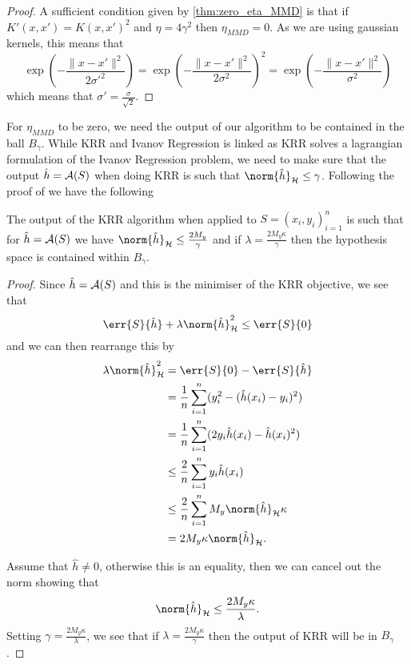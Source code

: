 \begin{proof}
  A sufficient condition given by \ref{thm:zero_eta_MMD} is that if \(K'(x, x') =
  K(x, x')^2\) and \(\eta = 4\gamma^2\) then \(\eta_{MMD} = 0\). As we are using
  gaussian kernels, this means that
  \begin{equation*}
    \exp(- \frac{\|x - x'\|^2}{2\sigma'^2}) = \exp(- \frac{\|x - x'\|^2}{2\sigma^2})^2 = \exp(- \frac{\|x - x'\|^2}{\sigma^2})
  \end{equation*}
  which means that \(\sigma' = \frac{\sigma}{\sqrt{2}}\).
\end{proof}

For \(\eta_{MMD}\) to be zero, we need the output of our algorithm to be
contained in the ball \(B_{\gamma}\). While KRR and Ivanov Regression is linked
as KRR solves a lagrangian formulation of the Ivanov Regression problem, we need
to make sure that the output \(\hat{h} = \mathcal{A}(S)\) when doing KRR is such that
\(\norm{\hat{h}}_{\rkhs{H}} \leq \gamma\). Following the proof of \cite[Lemma
1]{cortes14_domain_adapt_sampl_bias_correc} we have the following
\begin{lemma}
\label{lem:KRR-output-ball-bound} The output of the KRR algorithm when applied
to \(S = (x_{i}, y_{i})_{i=1}^{n}\) is such that for \(\hat{h} = \mathcal{A}(S)\) we have
\(\norm{\hat{h}}_{\rkhs{H}} \leq \frac{2 M_{y}}{\gamma}\) and if \(\lambda =
\frac{2 M_y \kappa}{\gamma}\) then the hypothesis space is contained within
\(B_{\gamma}\).
\end{lemma}
\begin{proof} Since \(\hat{h} = \mathcal{A}(S)\) and this is the minimiser of the KRR
objective, we see that
  \begin{equation*} \err{S}{\hat{h}} + \lambda \norm{\hat{h}}_{\rkhs{H}}^2 \leq
\err{S}{0}
  \end{equation*} and we can then rearrange this by
  \begin{align*} \lambda \norm{\hat{h}}_{\rkhs{H}}^2 & = \err{S}{0} -
\err{S}{\hat{h}} \\ & = \frac{1}{n} \sum_{i=1}^n (y_i^2 - (\hat{h}(x_i) -
y_i)^2) \\ & = \frac{1}{n} \sum_{i=1}^n (2 y_i \hat{h}(x_i) - \hat{h}(x_i)^2) \\
& \leq \frac{2}{n} \sum_{i=1}^n y_i \hat{h}(x_i) \\ & \leq \frac{2}{n}
\sum_{i=1}^n M_y \norm{\hat{h}}_{\rkhs{H}} \kappa \\ & = 2 M_y \kappa
\norm{\hat{h}}_{\rkhs{H}}.
  \end{align*}

  Assume that \(\hat{h} \neq 0\), otherwise this is an equality, then we can
cancel out the norm showing that
  \begin{equation}
    \label{eq:KRR-output-ball-bound} \norm{\hat{h}}_{\rkhs{H}} \leq \frac{2 M_y
\kappa}{\lambda}.
  \end{equation} Setting \(\gamma = \frac{2 M_y \kappa}{\lambda}\), we see that
if \(\lambda = \frac{2 M_y \kappa}{\gamma}\) then the output of KRR will be in
\(B_{\gamma}\).
\end{proof}

